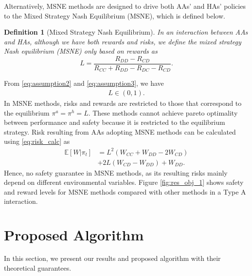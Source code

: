 \documentclass[letterpaper]{article} %
\newtheorem{definition}{Definition}
\begin{document}
Alternatively, MSNE methods are designed to drive both AAs' and HAs' policies to the Mixed Strategy Nash Equilibrium (MSNE), which is defined below.
\begin{definition}[Mixed Strategy Nash Equilibrium]
In an interaction between AAs and HAs, although we have both rewards and risks, we define the mixed strategy Nash equilibrium (MSNE) only based on rewards as
\begin{equation} \label{eq:msne}
L = \frac{R_{DD}-R_{CD}}{R_{CC}+R_{DD}-R_{DC}-R_{CD}}.
\end{equation}
\end{definition}
From \eqref{eq:assumption2} and \eqref{eq:assumption3}, we have
\begin{align}
\label{eq:assumption1}
    L\in(0,1).
\end{align}
In MSNE methods, risks and rewards are restricted to those that correspond to the equilibrium $\pi^a = \pi^h  = L$. These methods cannot achieve pareto optimality between performance and safety because it is restricted to the equilibrium strategy. 
Risk resulting from AAs adopting MSNE methods can be calculated using \eqref{eq:risk_calc} as
\begin{align}
    \mathbb{E}[W|\pi_t]&= L^2 (W_{CC} + W_{DD} - 2 W_{CD}) \\
    &+ 2L (W_{CD} - W_{DD}) + W_{DD}. \nonumber
\end{align}
Hence, no safety guarantee in MSNE methods, as its resulting risks mainly depend on different environmental variables. Figure \ref{fig:res_obj_1} shows safety and reward levels for MSNE methods compared with other methods in a Type A interaction.

\section{Proposed Algorithm}
\label{sec:proposed_algorithm}
In this section, we present our results and proposed algorithm with their theoretical guarantees.
\end{document}
